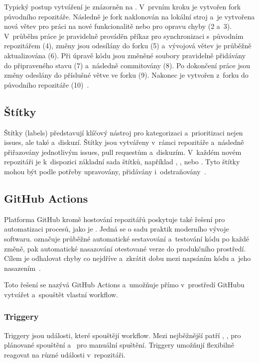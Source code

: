 Typický postup vytváření \PR je znázorněn na . V~prvním kroku je vytvořen fork původního repozitáře. Následně je fork naklonován na lokální stroj a~je vytvořena nová větev pro práci na nové funkcionalitě nebo pro opravu chyby (2 a~3). V~průběhu práce je pravidelně prováděn příkaz  pro synchronizaci s~původním repozitářem (4), změny jsou odesílány do forku (5) a~vývojová větev je průběžně aktualizována (6). Při úpravě kódu jsou změněné soubory pravidelně přidávány do připraveného stavu (7) a~následně commitovány (8). Po dokončení práce jsou změny odeslány do příslušné větve ve forku (9). Nakonec je vytvořen \PR{} z~forku do původního repozitáře (10)~\cite{psl_git_tutorial_main}.

\subsection{Štítky}
\label{subsec:github:labels}
Štítky (labels) představují klíčový nástroj pro kategorizaci a~prioritizaci nejen issues, ale také \PR a~diskuzí. Štítky jsou vytvářeny v~rámci repozitáře a~následně přiřazovány jednotlivým issues, pull requestům a~diskuzím. V~každém novém repozitáři je k~dispozici základní sada štítků, například , ,  nebo . Tyto štítky mohou být podle potřeby upravovány, přidávány i~odstraňovány~\cite{github_issues_docs}.

\subsection{GitHub Actions}
\label{subsec:github:actions}
Platforma GitHub kromě hostování repozitářů poskytuje také řešení pro automatizaci procesů, jako je \CICD.
Jedná se o sadu praktik moderního vývoje softwaru. \CI označuje průběžné automatické sestavování a~testování kódu po každé změně, \CD pak automatické nasazování otestované verze do produkčního prostředí.
Cílem je odhalovat chyby co nejdříve a~zkrátit dobu mezi napsáním kódu a~jeho nasazením~\cite{github_actions_docs}.

Toto řešení se nazývá GitHub Actions a~umožňuje přímo v~prostředí GitHubu vytvářet a~spouštět vlastní workflow.

\subsubsection*{Triggery}
\label{subsubsec:github:actions_triggery}
Triggery jsou události, které spouštějí workflow. Mezi nejběžnější patří , ,  pro plánované spouštění a~ pro manuální spuštění. Triggery umožňují flexibilně reagovat na různé události v~repozitáři.

